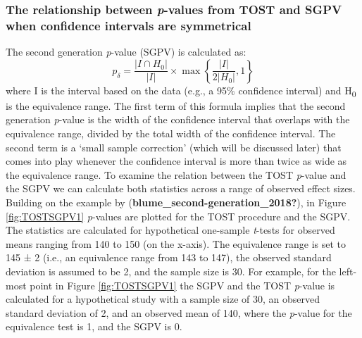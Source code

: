 \documentclass[
  english,
  man]{apa6}
\begin{document}
\hypertarget{the-relationship-between-p-values-from-tost-and-sgpv-when-confidence-intervals-are-symmetrical}{%
\subsubsection{\texorpdfstring{The relationship between \emph{p}-values from TOST and SGPV when confidence intervals are symmetrical}{The relationship between p-values from TOST and SGPV when confidence intervals are symmetrical}}\label{the-relationship-between-p-values-from-tost-and-sgpv-when-confidence-intervals-are-symmetrical}}

The second generation \emph{p}-value (SGPV) is calculated as:
\[
  p _ { \delta } = \frac { \left| I \cap H _ { 0 } \right| } { | I | } \times \max \left\{ \frac { | I | } { 2 \left| H _ { 0 } \right| } , 1 \right\}
\]
where I is the interval based on the data (e.g., a 95\(\%\) confidence interval) and H\textsubscript{0} is the equivalence range. The first term of this formula implies that the second generation \emph{p}-value is the width of the confidence interval that overlaps with the equivalence range, divided by the total width of the confidence interval. The second term is a `small sample correction' (which will be discussed later) that comes into play whenever the confidence interval is more than twice as wide as the equivalence range.
To examine the relation between the TOST \emph{p}-value and the SGPV we can calculate both statistics across a range of observed effect sizes. Building on the example by (\textbf{blume\_second-generation\_2018?}), in Figure \ref{fig:TOSTSGPV1} \emph{p}-values are plotted for the TOST procedure and the SGPV. The statistics are calculated for hypothetical one-sample \emph{t}-tests for observed means ranging from 140 to 150 (on the x-axis). The equivalence range is set to 145 ± 2 (i.e., an equivalence range from 143 to 147), the observed standard deviation is assumed to be 2, and the sample size is 30. For example, for the left-most point in Figure \ref{fig:TOSTSGPV1} the SGPV and the TOST \emph{p}-value is calculated for a hypothetical study with a sample size of 30, an observed standard deviation of 2, and an observed mean of 140, where the \emph{p}-value for the equivalence test is 1, and the SGPV is 0.
\end{document}
